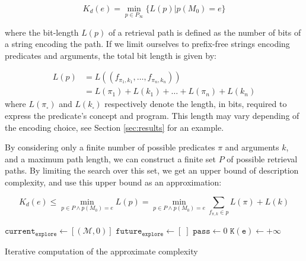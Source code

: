 \documentclass[entropy,article,submit,moreauthors,pdftex]{Definitions/mdpi}
\begin{document}
\begin{equation}
    \label{eq:k_desc}
    K_d(e) = \min_{p \in P_\infty} \{L(p) | p(M_0) = e\}
\end{equation}

where the bit-length $L(p)$ of a retrieval path is defined as the number of bits of a string encoding the path. If we limit ourselves to prefix-free strings encoding predicates and arguments, the total bit length is given by:

\begin{align}
    \label{eq:bit_lenght_p}
    L(p) & = L((f_{\pi_1,k_1}, \dots, f_{\pi_n, k_n}))     \\
         & = L(\pi_1) + L(k_1) + \dots + L(\pi_n) + L(k_n)
\end{align}
where $L(\pi_\square)$ and $L(k_\square)$ respectively denote the length, in bits, required to express the predicate's concept and program. This length may vary depending of the encoding choice, see Section \ref{sec:results} for an example.

By considering only a finite number of possible predicates $\pi$ and arguments $k$, and a maximum path length, we can construct a finite set $P$ of possible retrieval paths. By limiting the search over this set, we get an upper bound of description complexity, and use this upper bound as an approximation:

\begin{equation}
    \label{eq:approx_k_desc}
    K_d(e) \leq \min_{p \in P \land p(M_0) = e} L(p) = \min_{p \in P \land p(M_0)=e} \sum_{f_{\pi, k} \in p} L(\pi) + L(k)
\end{equation}

\begin{algorithm}
    $\mathtt{current_{explore}} \leftarrow [(\mathcal{M}, 0)]$ \;
    $\mathtt{future_{explore} \leftarrow} [\;]$ \;
    $\mathtt{pass} \leftarrow 0$ \;
    $\mathtt{K(e)} \leftarrow +\infty$ \;
    \caption{Iterative computation of the approximate complexity}
    \label{alg:complex_iter}
\end{algorithm}
\end{document}
